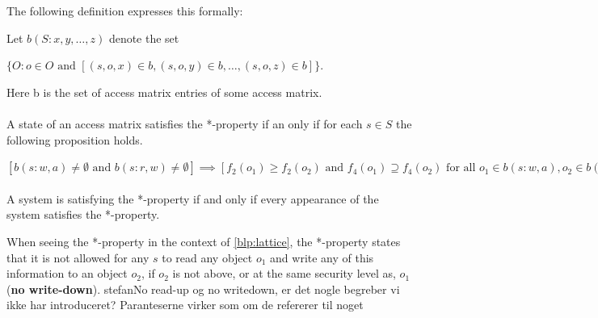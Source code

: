 The following definition expresses this formally:
\begin{definition}
Let $b(S:x,y, \dots, z)$ denote the set 

$\{O: o \in O \text{ and } [(s,o,x) \in b, (s,o,y) \in b, \dots, (s,o,z) \in b]\}$.

Here b is the set of access matrix entries of some access matrix.

\paragraph{}
\noindent{} 
A state of an access matrix satisfies the *-property if an only if for each $s \in S$ the following proposition holds.

$[b(s:w,a) \ne \emptyset \text{ and } b(s:r,w) \ne \emptyset] \implies [f_2(o_1) \ge f_2(o_2) \text{ and } f_4(o_1) \supseteq f_4(o_2) \text{ for all } o_1 \in b(s:w,a), o_2 \in b(s:r,w)]$

\paragraph{}
\noindent{} 
A system is satisfying the *-property if and only if every appearance of the system satisfies the *-property.
\end{definition}

When seeing the *-property in the context of \cref{blp:lattice}, the *-property states that it is not allowed for any \ssubject{} $s$ to read any object $o_1$ and write any of this information to an object $o_2$, if $o_2$ is not above, or at the same security level as, $o_1$ (\textbf{no write-down}).
stefan{No read-up og no writedown, er det nogle begreber vi ikke har introduceret? Paranteserne virker som om de refererer til noget}